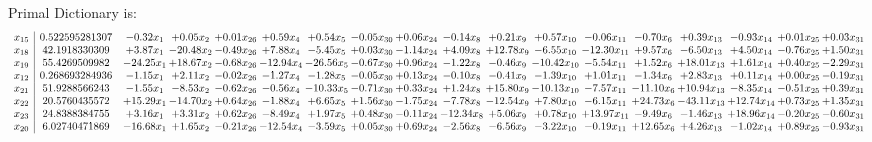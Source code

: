\documentclass[9pt]{article}
\begin{document}
Primal Dictionary is:
\[\begin{array}{c| c c@{\hskip 2pt} c@{\hskip 2pt} c@{\hskip 2pt} c@{\hskip 2pt} c@{\hskip 2pt} c@{\hskip 2pt} c@{\hskip 2pt} c@{\hskip 2pt} c@{\hskip 2pt} c@{\hskip 2pt} c@{\hskip 2pt} c@{\hskip 2pt} c@{\hskip 2pt} c@{\hskip 2pt} c@{\hskip 2pt} c@{\hskip 2pt} }
 x_{15}   &  0.522595281307 & -0.32 x_{1} & +  0.05 x_{2} & +  0.01 x_{26} & +  0.59 x_{4} & +  0.54 x_{5} & -0.05 x_{30} & +  0.06 x_{24} & -0.14 x_{8} & +  0.21 x_{9} & +  0.57 x_{10} & -0.06 x_{11} & -0.70 x_{6} & +  0.39 x_{13} & -0.93 x_{14} & +  0.01 x_{25} & +  0.03 x_{31}\\
 x_{18}   &  42.1918330309 & +  3.87 x_{1} & -20.48 x_{2} & -0.49 x_{26} & +  7.88 x_{4} & -5.45 x_{5} & +  0.03 x_{30} & -1.14 x_{24} & +  4.09 x_{8} & + 12.78 x_{9} & -6.55 x_{10} & -12.30 x_{11} & +  9.57 x_{6} & -6.50 x_{13} & +  4.50 x_{14} & -0.76 x_{25} & +  1.50 x_{31}\\
 x_{19}   &  55.4269509982 & -24.25 x_{1} & + 18.67 x_{2} & -0.68 x_{26} & -12.94 x_{4} & -26.56 x_{5} & -0.67 x_{30} & +  0.96 x_{24} & -1.22 x_{8} & -0.46 x_{9} & -10.42 x_{10} & -5.54 x_{11} & +  1.52 x_{6} & + 18.01 x_{13} & +  1.61 x_{14} & +  0.40 x_{25} & -2.29 x_{31}\\
 x_{12}   &  0.268693284936 & -1.15 x_{1} & +  2.11 x_{2} & -0.02 x_{26} & -1.27 x_{4} & -1.28 x_{5} & -0.05 x_{30} & +  0.13 x_{24} & -0.10 x_{8} & -0.41 x_{9} & -1.39 x_{10} & +  1.01 x_{11} & -1.34 x_{6} & +  2.83 x_{13} & +  0.11 x_{14} & +  0.00 x_{25} & -0.19 x_{31}\\
 x_{21}   &  51.9288566243 & -1.55 x_{1} & -8.53 x_{2} & -0.62 x_{26} & -0.56 x_{4} & -10.33 x_{5} & -0.71 x_{30} & +  0.33 x_{24} & +  1.24 x_{8} & + 15.80 x_{9} & -10.13 x_{10} & -7.57 x_{11} & -11.10 x_{6} & + 10.94 x_{13} & -8.35 x_{14} & -0.51 x_{25} & +  0.39 x_{31}\\
 x_{22}   &  20.5760435572 & + 15.29 x_{1} & -14.70 x_{2} & +  0.64 x_{26} & -1.88 x_{4} & +  6.65 x_{5} & +  1.56 x_{30} & -1.75 x_{24} & -7.78 x_{8} & -12.54 x_{9} & +  7.80 x_{10} & -6.15 x_{11} & + 24.73 x_{6} & -43.11 x_{13} & + 12.74 x_{14} & +  0.73 x_{25} & +  1.35 x_{31}\\
 x_{23}   &  24.8388384755 & +  3.16 x_{1} & +  3.31 x_{2} & +  0.62 x_{26} & -8.49 x_{4} & +  1.97 x_{5} & +  0.48 x_{30} & -0.11 x_{24} & -12.34 x_{8} & +  5.06 x_{9} & +  0.78 x_{10} & + 13.97 x_{11} & -9.49 x_{6} & -1.46 x_{13} & + 18.96 x_{14} & -0.20 x_{25} & -0.60 x_{31}\\
 x_{20}   &  6.02740471869 & -16.68 x_{1} & +  1.65 x_{2} & -0.21 x_{26} & -12.54 x_{4} & -3.59 x_{5} & +  0.05 x_{30} & +  0.69 x_{24} & -2.56 x_{8} & -6.56 x_{9} & -3.22 x_{10} & -0.19 x_{11} & + 12.65 x_{6} & +  4.26 x_{13} & -1.02 x_{14} & +  0.89 x_{25} & -0.93 x_{31}\\

\end{array}\]
\end{document}
